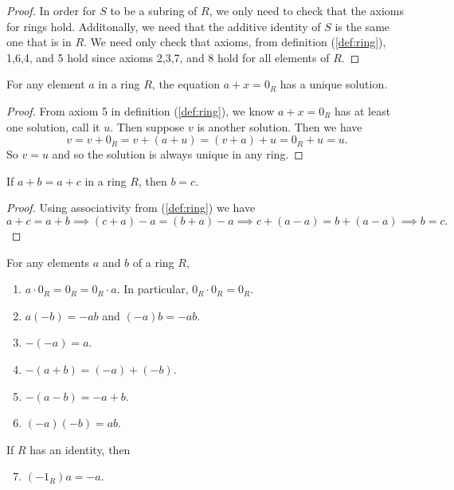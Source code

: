 \documentclass[../main.tex]{subfiles}
\begin{document}
\begin{proof}
In order for $S$ to be a subring of $R$, we only need to check that the axioms for rings hold. 
Additonally, we need that the additive identity of $S$ is 
the same one that is in $R$. We need only check that 
axioms, from definition (\ref{def:ring}), 1,6,4, and 5 hold
since axioms 2,3,7, and 8 hold for all elements of $R$.
\end{proof}



\begin{theorem} \label{thm:uniqueness of additive inverse}
For any element $a$ in a ring $R$, the equation $a + x = 0_R$ has a unique solution.
\end{theorem}

\begin{proof}
From axiom 5 in definition (\ref{def:ring}), we know $a+x = 0_R$ has at least one solution, 
call it $u$. Then suppose $v$ is another solution. Then we have
\[
v = v + 0_R = v + (a+u) = (v+a) + u = 0_R + u = u.
\]
So $v=u$ and so the solution is always unique in any ring.
\end{proof}



\begin{theorem}\label{thm:subtraction}
If $a + b = a + c$ in a ring $R$, then $b = c$.
\end{theorem}

\begin{proof}
Using associativity from (\ref{def:ring}) we have
\[
a + c = a+b \implies (c+a)-a = (b+a)-a \implies c+(a-a) = b+(a-a)\implies b = c.
\]
\end{proof}



\begin{proposition} \label{prp:ring arithmetic with subtraction}
For any elements $a$ and $b$ of a ring $R$,
\begin{enumerate}
    \item $a \cdot 0_R = 0_R = 0_R \cdot a$. In particular, $0_R \cdot 0_R = 0_R$.
    \item $a(-b) = -ab$ \quad and \quad $(-a)b = -ab$.
    \item $-(-a) = a$.
    \item $-(a + b) = (-a) + (-b)$.
    \item $-(a - b) = -a + b$.
    \item $(-a)(-b) = ab$.
\end{enumerate}
If $R$ has an identity, then
\begin{enumerate}
    \setcounter{enumi}{6}
    \item $(-1_R)a = -a$.
\end{enumerate}
\end{proposition}
\end{document}

